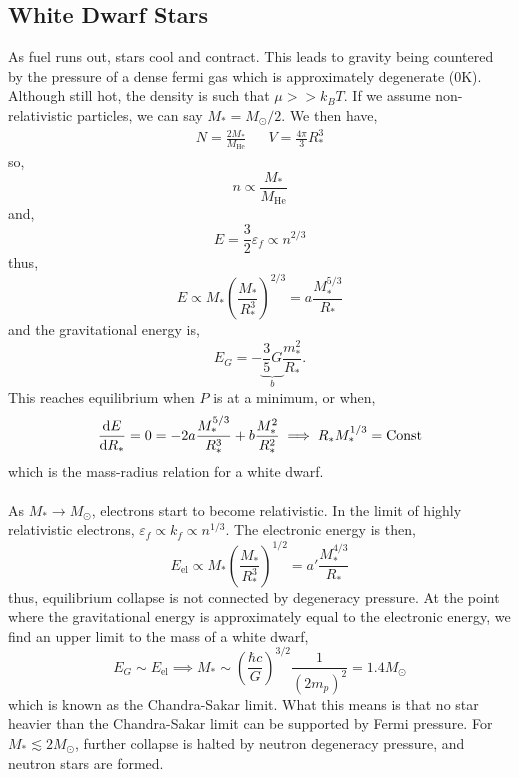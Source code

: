 \documentclass{book}
\begin{document}
\subsection{White Dwarf Stars}
As fuel runs out, stars cool and contract. This leads to gravity being countered by the pressure of a dense fermi gas which is approximately degenerate ($0$K). Although still hot, the density is such that $\mu >> k_BT$. If we assume non-relativistic particles, we can say $M_* = M_{\odot}/2$. We then have,
\begin{align}
	N = \frac{2M_*}{M_{\text{He}}} && V = \frac{4\pi}{3}R_*^3
\end{align}
so,
\begin{equation}
	n \propto \frac{M_*}{M_{\text{He}}}
\end{equation}
and,
\begin{equation}
	E = \frac{3}{2}\varepsilon_f \propto n^{2/3}
\end{equation}
thus,
\begin{equation}
	E \propto M_{*}\left(\frac{M_*}{R_*^3}\right)^{2/3} = a \frac{M_*^{5/3}}{R_*}
\end{equation}
and the gravitational energy is,
\begin{equation}
	E_G = -\underbrace{\frac{3}{5}G}_{b} \frac{m_*^2}{R_*}.
\end{equation}
This reaches equilibrium when $P$ is at a minimum, or when,
\begin{equation}
	\dv{E}{R_*} = 0 = -2a\frac{M_*^{5/3}}{R_*^3} + b\frac{M_*^2}{R_*^2} \implies R_*M_*^{1/3} = \text{Const}
\end{equation}
which is the mass-radius relation for a white dwarf.
\\\\
As $M_* \to M_{\odot}$, electrons start to become relativistic. In the limit of highly relativistic electrons, $\varepsilon_f \propto k_f \propto n^{1/3}$. The electronic energy is then,
\begin{equation}
	E_{\text{el}} \propto M_*\left(\frac{M_*}{R_*^3}\right)^{1/2} = a'\frac{M_*^{4/3}}{R_*}
\end{equation}
thus, equilibrium collapse is not connected by degeneracy pressure. At the point where the gravitational energy is approximately equal to the electronic energy, we find an upper limit to the mass of a white dwarf,
\begin{equation}
	E_{G} \sim E_{\text{el}} \implies M_* \sim \left(\frac{\hbar c}{G}\right)^{3/2}\frac{1}{(2m_p)^2} = 1.4M_{\odot}
\end{equation}
which is known as the Chandra-Sakar limit. What this means is that no star heavier than the Chandra-Sakar limit can be supported by Fermi pressure. For $M_* \lesssim 2M_{\odot}$, further collapse is halted by neutron degeneracy pressure, and neutron stars are formed.
\end{document}
